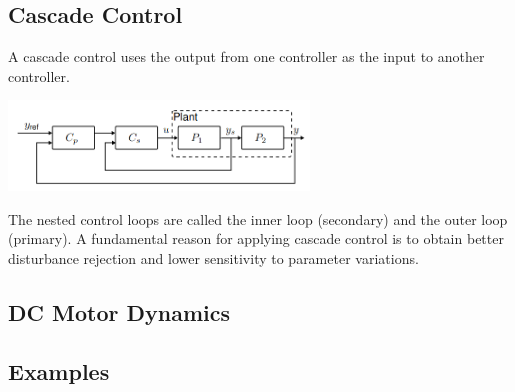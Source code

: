 \subsection{Cascade Control}
A cascade control uses the output from one controller as the input to another controller.


\begin{center}
	\includegraphics[width=0.6\textwidth]{Images/cascade.png}
\end{center}

The nested control loops are called the inner loop (secondary) and the outer loop (primary).
A fundamental reason for applying cascade control is to obtain better disturbance rejection
and lower sensitivity to parameter variations.


\subsection{DC Motor Dynamics}

\subsection{Examples}
